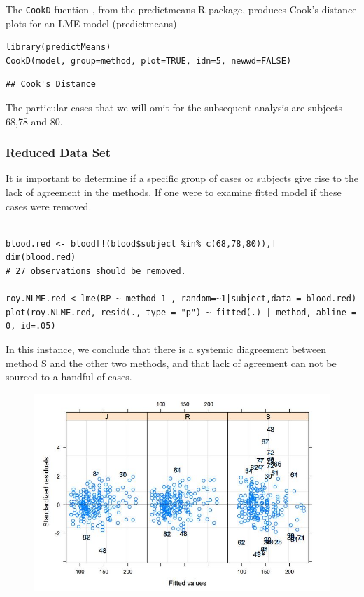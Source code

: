 \documentclass[Main.tex]{subfiles}
\begin{document}
The \texttt{CookD} fucntion , from the predictmeans R package, produces Cook’s distance plots for an LME model 
 (predictmeans)



\begin{framed}
\begin{verbatim}
library(predictMeans)
CookD(model, group=method, plot=TRUE, idn=5, newwd=FALSE)
\end{verbatim}
\end{framed}


\begin{verbatim}
## Cook's Distance

\end{verbatim}

The particular cases that we will omit for the subsequent analysis are subjects 68,78 and 80.

\subsubsection{Reduced Data Set}
It is important to determine if a specific group of cases or subjects give rise to the lack of agreement in the methods. If one were to examine fitted model if these cases were removed.

\begin{framed}
\begin{verbatim}

blood.red <- blood[!(blood$subject %in% c(68,78,80)),]
dim(blood.red)
# 27 observations should be removed.

roy.NLME.red <-lme(BP ~ method-1 , random=~1|subject,data = blood.red)
plot(roy.NLME.red, resid(., type = "p") ~ fitted(.) | method, abline = 0, id=.05)
\end{verbatim}
\end{framed}

In this instance, we conclude that there is a systemic diagreement between method S and the other two methods, and that lack of agreement can not be sourced to a handful of cases.
\begin{figure}[h!]
	\centering
	\includegraphics[width=0.7\linewidth]{images/bloodnlmeResidPlot2B}
\end{figure}
\end{document}
